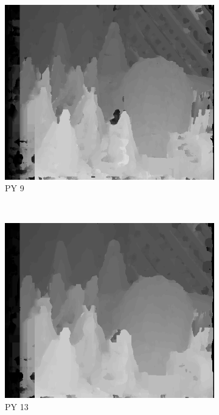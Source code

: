 \begin{figure}
  \begin{subfigure}[b]{0.23\textwidth}
    \centering
    \includegraphics[width=\textwidth]{images/stereo-pairs/cones_pyramid_9.png}
    \caption{PY 9}
  \end{subfigure}
  ~
  \begin{subfigure}[b]{0.23\textwidth}
    \centering
    \includegraphics[width=\textwidth]{images/stereo-pairs/cones_pyramid_13.png}
    \caption{PY 13}
  \end{subfigure}
  ~
  \begin{subfigure}[b]{0.23\textwidth}

\end{subfigure}
\end{figure}

